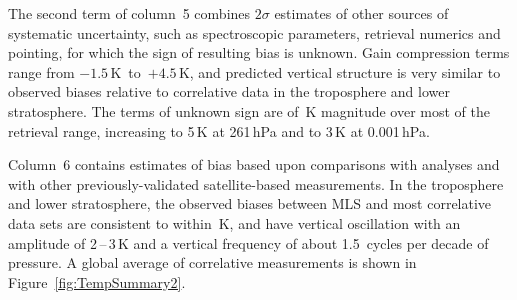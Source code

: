 \documentclass[11pt,draft]{report}
\begin{document}
The second term of column~5 combines $2\sigma$ estimates of other
sources of systematic uncertainty, such as spectroscopic parameters,
retrieval numerics and pointing, for which the sign of resulting bias is
unknown.  Gain compression terms range from $-1.5\,$K~to~$+4.5$\,K, and
predicted vertical structure is very similar to observed biases relative
to correlative data in the troposphere and lower stratosphere.  The
terms of unknown sign are of \,K magnitude over most of
the retrieval range, increasing to 5\,K at 261\,hPa and to 3\,K at
0.001\,hPa.

Column~6 contains estimates of bias based upon comparisons with analyses
and with other previously-validated satellite-based measurements.  In
the troposphere and lower stratosphere, the observed biases between MLS
and most correlative data sets are consistent to within
\,K, and have vertical oscillation with an amplitude of
2\,--\,3\,K and a vertical frequency of about 1.5~cycles per decade of
pressure.  A global average of correlative measurements is shown in
Figure~\ref{fig:TempSummary2}.
\end{document}
